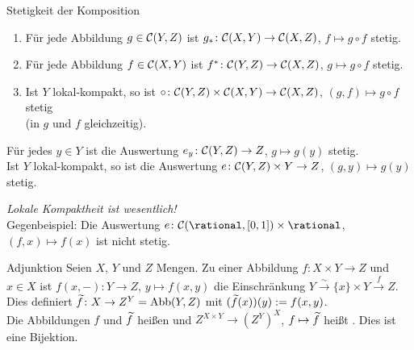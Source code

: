 \linie
\pagebreak

\begin{Satz}{Stetigkeit der Komposition}
    \begin{enumerate}
        \item
        Für jede Abbildung $g \in \mathcal{C}(Y, Z)$ ist
        $g_\ast\colon \mathcal{C}(X, Y) \rightarrow \mathcal{C}(X, Z)$, $f \mapsto g \circ f$
        stetig.

        \item
        Für jede Abbildung $f \in \mathcal{C}(X, Y)$ ist
        $f^\ast\colon \mathcal{C}(Y, Z) \rightarrow \mathcal{C}(X, Z)$, $g \mapsto g \circ f$
        stetig.

        \item
        Ist $Y$ lokal-kompakt, so ist
        $\circ\colon \mathcal{C}(Y, Z) \times \mathcal{C}(X, Y) \rightarrow \mathcal{C}(X, Z)$,
        $(g, f) \mapsto g \circ f$ stetig \\
        (in $g$ und $f$ gleichzeitig).
    \end{enumerate}
\end{Satz}

\begin{Kor}
    Für jedes $y \in Y$ ist die Auswertung
    $e_y\colon \mathcal{C}(Y, Z) \rightarrow Z$, $g \mapsto g(y)$ stetig. \\
    Ist $Y$ lokal-kompakt, so ist die Auswertung
    $e\colon \mathcal{C}(Y, Z) \times Y \rightarrow Z$, $(g, y) \mapsto g(y)$ stetig.
\end{Kor}

\begin{Bem}
    \emph{Lokale Kompaktheit ist wesentlich!} \\
    Gegenbeispiel: Die Auswertung
    $e\colon \C(\rational, [0, 1]) \times \rational$, $(f, x) \mapsto f(x)$
    ist nicht stetig.
\end{Bem}

\linie

\begin{Def}{Adjunktion}
    Seien $X$, $Y$ und $Z$ Mengen.
    Zu einer Abbildung $f\colon X \times Y \rightarrow Z$ und $x \in X$
    ist $f(x, -)\colon Y \rightarrow Z$, $y \mapsto f(x, y)$ die
    Einschränkung $Y \xrightarrow{\sim} \{x\} \times Y \xrightarrow{f} Z$. \\
    Dies definiert $\widetilde{f}\colon X \rightarrow Z^Y = \operatorname{Abb}(Y, Z)$ mit
    $(\widetilde{f}(x))(y) := f(x, y)$. \\
    Die Abbildungen $f$ und $\widetilde{f}$ heißen 
    und $Z^{X \times Y} \rightarrow (Z^Y)^X$, $f \mapsto \widetilde{f}$
    heißt .
    Dies ist eine Bijektion.
\end{Def}

